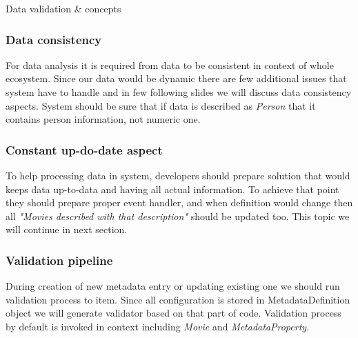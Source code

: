 \documentclass{beamer}
\begin{document}
\begin{section}{Data validation \& concepts}

\begin{frame}
\frametitle{Data consistency}
For data analysis it is required from data to be consistent in context of whole ecosystem. Since our data would be dynamic there are few additional issues that system have to handle and in few following slides we will discuss data consistency aspects. \newline \newline
System should be sure that if data is described as \textit{Person} that it contains person information, not numeric one.
\end{frame}

\begin{frame}
\frametitle{Constant up-do-date aspect}
To help processing data in system, developers should prepare solution that would keeps data up-to-data and having all actual information. To achieve that point they should prepare proper event handler, and when definition would change then all \textit{"Movies described with that description"} should be updated too. \newline
\newline
This topic we will continue in next section.

\end{frame}

\begin{frame}
\frametitle{Validation pipeline}
During creation of new metadata entry or updating existing one we should run validation process to  item. Since all configuration is stored in MetadataDefinition object we will generate validator based on that part of code. Validation process by default is invoked in context including \textit{Movie} and \textit{MetadataProperty}.
\end{frame}


\end{section}
\end{document}
